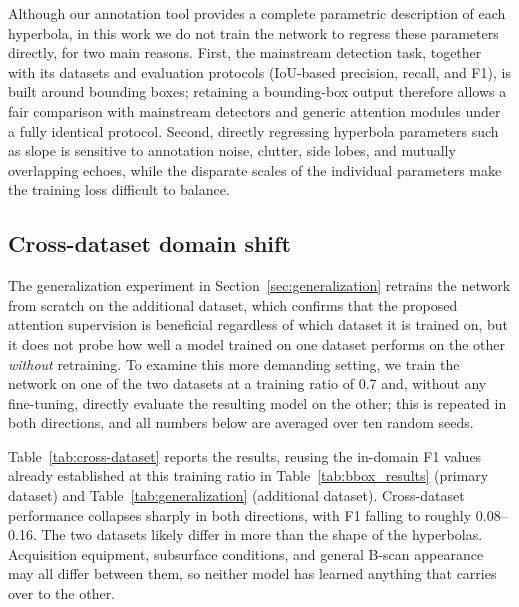 \documentclass[lettersize,journal]{IEEEtran}
\begin{document}
Although our annotation tool provides a complete parametric description of each
hyperbola, in this work we do not train the network to regress these parameters
directly, for two main reasons. First, the mainstream detection task, together
with its datasets and evaluation protocols (IoU-based precision, recall, and
F1), is built around bounding boxes; retaining a bounding-box output therefore
allows a fair comparison with mainstream detectors and generic attention modules
under a fully identical protocol. Second, directly regressing hyperbola
parameters such as slope is sensitive to annotation noise, clutter, side lobes,
and mutually overlapping echoes, while the disparate scales of the individual
parameters make the training loss difficult to balance.




\subsection{Cross-dataset domain shift}
\label{sec:cross-dataset}
The generalization experiment in Section~\ref{sec:generalization} retrains the
network from scratch on the additional dataset, which confirms that the proposed
attention supervision is beneficial regardless of which dataset it is trained
on, but it does not probe how well a model trained on one dataset performs on
the other \emph{without} retraining. To examine this more demanding setting, we
train the network on one of the two datasets at a training ratio of 0.7 and,
without any fine-tuning, directly evaluate the resulting model on the other;
this is repeated in both directions, and all numbers below are averaged over ten
random seeds.

Table~\ref{tab:cross-dataset} reports the results, reusing the in-domain F1
values already established at this training ratio in
Table~\ref{tab:bbox_results} (primary dataset) and
Table~\ref{tab:generalization} (additional dataset). Cross-dataset performance
collapses sharply in both directions, with F1 falling to roughly 0.08--0.16. The
two datasets likely differ in more than the shape of the hyperbolas. Acquisition
equipment, subsurface conditions, and general B-scan appearance may all differ
between them, so neither model has learned anything that carries over to the
other.
\end{document}
